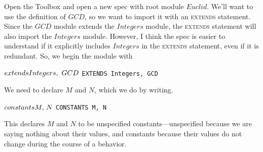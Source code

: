 \documentclass[fleqn,leqno]{article}
\begin{document}
Open the Toolbox and open a new spec with root module $Euclid$.  We'll
want to use the definition of $GCD$, so we want to import it with an
\textsc{extends} statement.  Since the $GCD$ module extends the
$Integers$ module, the \textsc{extends} statement will also import the
$Integers$ module.  However, I think the spec is easier to understand
if it explicitly includes $Integers$ in the \textsc{extends}
statement, even if it is redundant.  So, we begin the module with
\begin{twocols}
$\EXTENDS Integers,\ GCD$
 \midcol
\verb|EXTENDS Integers, GCD|
\end{twocols}
We need to declare $M$ and $N$, which we do by writing.%
%
\begin{twocols} 
$\CONSTANTS M,\, N$%
 \midcol 
\tt CONSTANTS M, N 
\end{twocols}
This declares $M$ and $N$ to be
unspecified constants---unspecified because we are saying nothing
about their values, and constants because their values do not change
during the course of a behavior.
\end{document}
